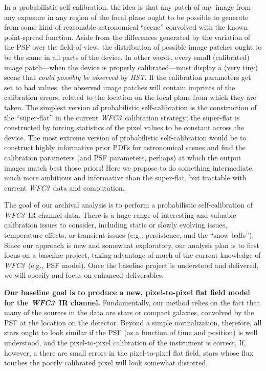 \documentclass[12pt]{article}
\newcommand{\project}[1]{\textsl{#1}}
\newcommand{\HST}{\project{HST}}
\newcommand{\WFC}{\project{WFC3}}
\begin{document}
In a probabilistic self-calibration, the idea is that any patch of any
image from any exposure in any region of the focal plane ought to be
possible to generate from some kind of reasonable astronomical
``scene'' convolved with the known point-spread function.  Aside from
the differences generated by the variation of the PSF over the
field-of-view, the distribution of possible image patches ought to be
the same in all parts of the device.  In other words, every small
(calibrated) image patch---when the device is properly
calibrated---must display a (very tiny) scene that \emph{could
  possibly be observed} by \HST.  If the calibration parameters get
set to bad values, the observed image patches will contain imprints of
the calibration errors, related to the location on the focal plane
from which they are taken.  The simplest version of probabilistic
self-calibration is the construction of the ``super-flat'' in the
current \WFC\ calibration strategy; the super-flat is constructed by
forcing statistics of the pixel values to be constant across the
device.  The most extreme version of probabilistic self-calibration
would be to construct highly informative prior PDFs for astronomical
scenes and find the calibration parameters (and PSF parameters,
perhaps) at which the output images match best those priors!  Here we
propose to do something intermediate, much more ambitious and
informative than the super-flat, but tractable with current \WFC\ data
and computation.

%
\describearchival       %

The goal of our archival analysis is to perform a probabilistic
self-calibration of \WFC\ IR-channel data.  There is a huge range of interesting
and valuable calibration issues to consider, including static or slowly 
evolving issues, temperature effects, or transient
issues (e.g., persistence, and the ``snow balls'').  Since our approach is
new and somewhat exploratory, our analysis plan is to first focus on
a baseline project, taking advantage of much of the current
knowledge of \WFC\ (e.g., PSF model).  Once the baseline project is understood
and delivered, we will specify and focus on enhanced deliverables.

\textbf{Our baseline goal is to produce a new, pixel-to-pixel
  flat field model for the \WFC\ IR channel.}
Fundamentally, our method relies on the fact
that many of the sources in the data are stars or compact galaxies, convolved by the PSF at
the location on the detector.  Beyond a simple normalization,
therefore, all stars ought to look similar if the PSF (as a
function of time and position) is well understood, and the
pixel-to-pixel calibration of the instrument is correct.  If, however,
a there are small errors in the pixel-to-pixel flat field, stars whose flux
touches the poorly calibrated pixel will look somewhat distorted.
\end{document}
